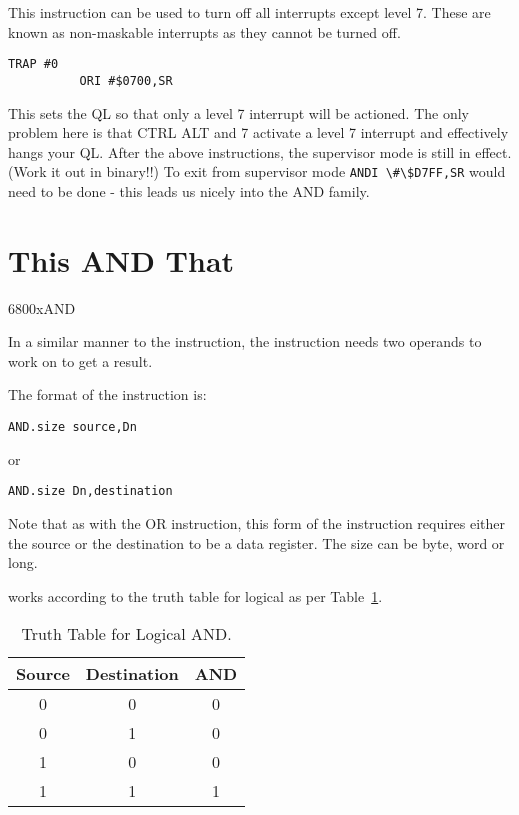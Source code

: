 This instruction can be used to turn off all interrupts except level
    7. These are known as non-{}maskable interrupts as they cannot be turned
    off.

\begin{lstlisting}[firstnumber=1,]
          TRAP #0
          ORI #$0700,SR
\end{lstlisting}

This sets the QL so that only a level 7 interrupt will be actioned.
    The only problem here is that CTRL ALT and 7 activate a level 7 interrupt
    and effectively hangs your QL. After the above instructions, the
    supervisor mode is still in effect. (Work it out in binary!!) To exit
    from supervisor mode \lstinline{ANDI \#\$D7FF,SR} would need to be done -{} this leads us
    nicely into the AND family.

\section{This AND That}\mc6800x{AND}
\label{ch4-and}%

In a similar manner to the  instruction, the  instruction needs
    two operands to work on to get a result.

The format of the  instruction is:

\begin{lstlisting}[firstnumber=1,]
          AND.size source,Dn
\end{lstlisting}

or

\begin{lstlisting}[firstnumber=1,]
          AND.size Dn,destination
\end{lstlisting}

Note that as with the OR instruction, this form of the instruction
    requires either the source or the destination to be a data register. The
    size can be byte, word or long.

 works according to the truth table for logical  as per Table~\ref{tab:TruthTableForLogicalAND}.


\begin{table}[h]
\centering
\begin{tabular}{cc|c}

Source & Destination & AND\\ \hline
0 & 0 & 0 \\
0 & 1 & 0 \\
1 & 0 & 0 \\
1 & 1 & 1

\end{tabular}
\caption{Truth Table for Logical AND.}
\label{tab:TruthTableForLogicalAND}
\end{table}


